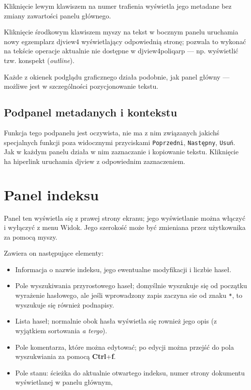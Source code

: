 \documentclass{mwart}
\def\key#1{\textbf{#1}}
\begin{document}
Kliknięcie lewym klawiszem na numer trafienia wyświetla jego metadane
bez zmiany zawartości panelu głównego.

Kliknięcie środkowym klawiszem myszy na tekst w bocznym panelu
uruchamia nowy egzemplarz \textsf{djview4} wyświetlający odpowiednią
stronę; pozwala to wykonać na tekście operacje aktualnie nie dostępne
w \textsf{djview4poliqarp} --- np. wyświetlić tzw. konspekt
(\textit{outline}).

Każde z okienek podglądu graficznego działa podobnie, jak panel główny
--- możliwe jest w szczególności pozycjonowanie tekstu.

\subsection{Podpanel metadanych i kontekstu}
\label{sec:podpanel-metadanych-i}

Funkcja tego podpanelu jest oczywista, nie ma z nim związanych jakichś
specjalnych funkcji poza widocznymi przyciskami \texttt{Poprzedni},
\texttt{Następny}, \texttt{Usuń}. Jak w każdym panelu działa w nim
zaznaczanie i kopiowanie tekstu. Kliknięcie ha hiperlink uruchamia
\textsf{djview} z odpowiednim zaznaczeniem.




\section{Panel indeksu}
\label{sec:panel-indeksu}

Panel ten wyświetla się z prawej strony ekranu; jego wyświetlanie
można włączyć i wyłączyć z menu \textsf{Widok}. Jego szerokość może
być zmieniana przez użytkownika za pomocą myszy.

Zawiera on następujące elementy:
\begin{itemize}
\item Informacja o nazwie indeksu, jego ewentualne modyfikacji i liczbie haseł.
\item Pole wyszukiwania przyrostowego haseł; domyślnie wyszukuje się
  od początku wyrażenie hasłowego, ale jeśli wprowadzony zapis zaczyna
  sie od znaku \texttt{*}, to wyszukuje się również podnapisy.
\item Lista haseł; normalnie obok hasła wyświetla się rownież jego
  opis (z wyjątkiem sortowania \textit{a tergo}).
\item Pole komentarza, które można edytować; po edycji można przejść
  do pola wyszukwiania za pomocą \key{Ctrl}+\key{f}.
\item Pole stanu: ścieżka do aktualnie otwartego indeksu, numer strony
  dokumentu wyświetlanej w panelu głównym,
\end{itemize}
\end{document}
